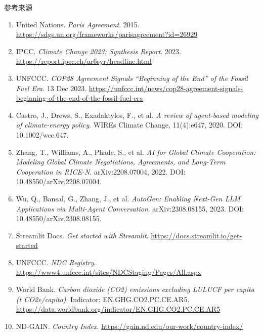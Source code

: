 \documentclass[aspectratio=169,10.5pt]{ctexbeamer}
\begin{document}
\begin{frame}[allowframebreaks]{参考来源}
  \scriptsize
  \begin{enumerate}
    \item United Nations. \emph{Paris Agreement}. 2015. \url{https://sdgs.un.org/frameworks/parisagreement?id=26929}
    \item IPCC. \emph{Climate Change 2023: Synthesis Report}. 2023. \url{https://report.ipcc.ch/ar6syr/headline.html}
    \item UNFCCC. \emph{COP28 Agreement Signals ``Beginning of the End'' of the Fossil Fuel Era}. 13 Dec 2023. \url{https://unfccc.int/news/cop28-agreement-signals-beginning-of-the-end-of-the-fossil-fuel-era}
    \item Castro, J., Drews, S., Exadaktylos, F., et al. \emph{A review of agent-based modeling of climate-energy policy}. WIREs Climate Change, 11(4):e647, 2020. DOI: 10.1002/wcc.647.
    \item Zhang, T., Williams, A., Phade, S., et al. \emph{AI for Global Climate Cooperation: Modeling Global Climate Negotiations, Agreements, and Long-Term Cooperation in RICE-N}. arXiv:2208.07004, 2022. DOI: 10.48550/arXiv.2208.07004.
    \item Wu, Q., Bansal, G., Zhang, J., et al. \emph{AutoGen: Enabling Next-Gen LLM Applications via Multi-Agent Conversation}. arXiv:2308.08155, 2023. DOI: 10.48550/arXiv.2308.08155.
    \item Streamlit Docs. \emph{Get started with Streamlit}. \url{https://docs.streamlit.io/get-started}
    \item UNFCCC. \emph{NDC Registry}. \url{https://www4.unfccc.int/sites/NDCStaging/Pages/All.aspx}
    \item World Bank. \emph{Carbon dioxide (CO2) emissions excluding LULUCF per capita (t CO2e/capita)}. Indicator: EN.GHG.CO2.PC.CE.AR5. \url{https://data.worldbank.org/indicator/EN.GHG.CO2.PC.CE.AR5}
    \item ND-GAIN. \emph{Country Index}. \url{https://gain.nd.edu/our-work/country-index/}
  \end{enumerate}
\end{frame}
\end{document}
